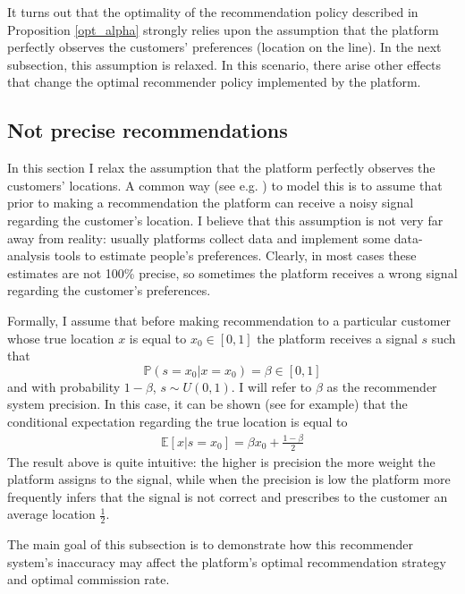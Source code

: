 \documentclass[a4paper]{article}
\begin{document}
It turns out that the optimality of the recommendation policy described in Proposition \ref{opt_alpha} strongly relies upon the assumption that the platform perfectly observes the customers' preferences (location on the line). In the next subsection, this assumption is relaxed. In this scenario, there arise other effects that change the optimal recommender policy implemented by the platform.

\subsection{Not precise recommendations}
In this section I relax the assumption that the platform perfectly observes the customers' locations. A common way (see e.g. \cite{lewis1994supplying} ) to model this is to assume that prior to making a recommendation the platform can receive a noisy signal regarding the customer's location. I believe that this assumption is not very far away from reality: usually platforms collect data and implement some data-analysis tools to estimate people's preferences. Clearly, in most cases these estimates are not 100\% precise, so sometimes the platform receives a wrong signal regarding the customer's preferences.




Formally, I assume that before making recommendation to a particular customer whose true location $x$ is equal to $x_0 \in [0, 1]$ the platform receives a signal $s$ such that $$\mathbb{P}(s=x_0|x=x_0) = \beta \in [0, 1]$$ and with probability $1-\beta$, $s \sim U(0, 1)$. I will refer to $\beta$ as the recommender system precision. In this case, it can be shown (see  \cite{li2018recommender} for example) that the conditional expectation regarding the true location is equal to \begin{align}\label{signal}
\mathbb{E}[x|s=x_0] = \beta x_0 + \frac{1-\beta}{2}
\end{align}
The result above is quite intuitive: the higher is precision the more weight the platform assigns to the signal, while when the precision is low the platform more frequently infers that the signal is not correct and prescribes to the customer an average location $\frac{1}{2}$. 


The main goal of this subsection is to demonstrate how this recommender system's inaccuracy may affect the platform's optimal recommendation strategy and optimal commission rate.
\end{document}
